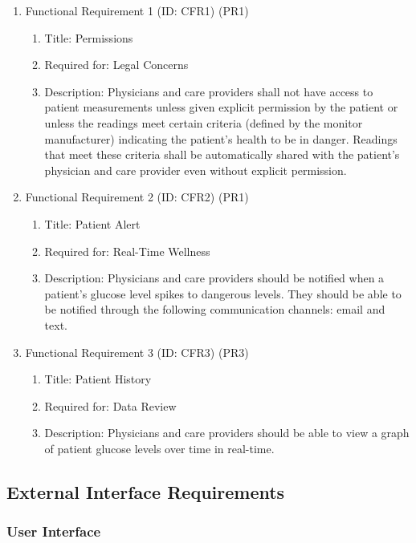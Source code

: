 \documentclass[12pt]{article}
\begin{document}
\begin{enumerate}
    \item Functional Requirement 1 (ID: CFR1) (PR1)
    \begin{enumerate}
        \item Title: Permissions
        \item Required for: Legal Concerns
        \item Description: Physicians and care providers shall not have access to patient measurements unless given
        explicit permission by the patient or unless the readings meet certain criteria (defined by the monitor
        manufacturer) indicating the patient’s health to be in danger. Readings that meet these criteria shall be
        automatically shared with the patient’s physician and care provider even without explicit permission.
    \end{enumerate}
    \item Functional Requirement 2 (ID: CFR2) (PR1)
    \begin{enumerate}
        \item Title: Patient Alert
        \item Required for: Real-Time Wellness
        \item Description: Physicians and care providers should be notified when a patient's glucose level spikes
        to dangerous levels. They should be able to be notified through the following communication channels: email and text.
   \end{enumerate}
   \item Functional Requirement 3 (ID: CFR3) (PR3)
    \begin{enumerate}
        \item Title: Patient History
        \item Required for: Data Review
        \item Description: Physicians and care providers should be able to view a graph of patient glucose levels over
        time in real-time.
   \end{enumerate}
\end{enumerate}

\subsection{External Interface Requirements}

\subsubsection{User Interface}
\end{document}
